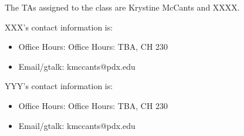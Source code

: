 The TAs assigned to the class are Krystine McCants and XXXX. 

XXX's contact information is:
\begin{itemize}
 \item Office Hours: Office Hours: TBA, CH 230
 \item Email/gtalk: kmccants@pdx.edu
\end{itemize}

YYY's contact information is:
\begin{itemize}
 \item Office Hours: Office Hours: TBA, CH 230
 \item Email/gtalk: kmccants@pdx.edu
\end{itemize}

